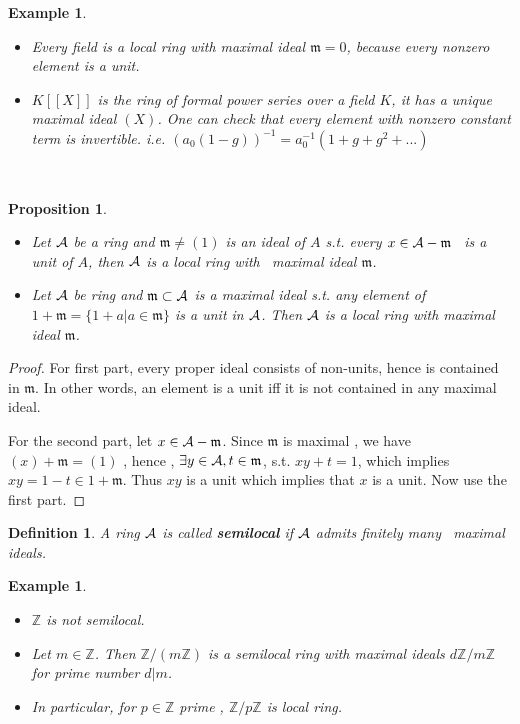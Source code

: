 \documentclass[11pt]{article}
\newtheorem{prop}[thm]{Proposition}
\newtheorem{dfn}[thm]{Definition}
\newtheorem{ex}[thm]{Example}
\newcommand{\intg}{\mathbb Z}
\newcommand{\scm}{{\mathfrak m}}
\newcommand{\cala}{{\cal A}}
\begin{document}
\begin{ex}
\ 
\begin{itemize}
\item
Every field is a local ring with maximal ideal $\scm=0$, because every nonzero element is a unit.
\item
$K[[X]]$ is the ring of formal power series over a field $K$, it has a unique maximal ideal $(X)$. One can check that every element with nonzero constant term is invertible. i.e. $(a_0(1-g))^{-1}=a_0^{-1}(1+g+g^2+...)$
\end{itemize}
\end{ex}
 
\begin{prop}\label{prop:local_ring_maximal}\ 
\begin{itemize}
\item 
Let $\cala$ be a ring and $\scm\neq (1)$ is an ideal of $A$ s.t. every $x\in \cala-\scm$  is a unit of $A$, then $\cala$ is a local ring with  maximal ideal $\scm$.
\item
Let $\cala$ be ring and $\scm\subset \cala$ is a maximal ideal s.t. any element of $1+\scm=\{1+a|a\in \scm \}$ is a unit in $\cala$. Then $\cala$ is a local ring with maximal ideal $\scm$.
\end{itemize}
\end{prop}

\begin{proof}
For first part, every proper ideal consists of non-units, hence is contained in $\scm$. In other words, an element is a unit iff it is not contained in any maximal ideal.

For the second part, let $x\in \cala-\scm$. Since $\scm$ is maximal , we have $(x)+\scm=(1)$ , hence , $\exists y\in \cala, t\in \scm$, s.t. $xy+t=1$, which implies $xy=1-t\in 1+\scm.$ Thus $xy$ is a unit which implies that $x$ is a unit. Now use the first part.
\end{proof}

\begin{dfn}
A ring $\cala$ is called \textbf{semilocal} if $\cala$ admits finitely many  maximal ideals.
\end{dfn}

\begin{ex}\ 
\begin{itemize}
\item 
$\intg$ is not semilocal.
\item
Let $m\in \intg$. Then $\intg/(m\intg)$ is a semilocal ring with maximal ideals $ d\intg/m\intg$ for prime number $d|m$.
\item In particular, for $p\in \intg$ prime , $\intg/p \intg$ is local ring.
\end{itemize}
\end{ex}
\end{document}
